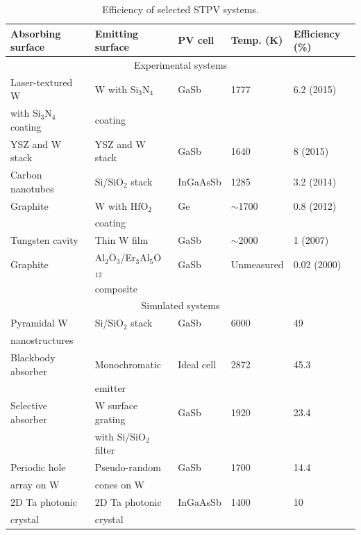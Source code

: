 \documentclass[10pt,letterpaper]{article}
\begin{document}
\begin{table}
	\caption{Efficiency of selected STPV systems.}
	\label{STPV_sys_table}
	\begin{center}
		\begin{tabular}{|lllll|}
		\hline
		Absorbing surface & Emitting surface & PV cell & Temp. (K) & Efficiency (\%)\\
		\hline
		\multicolumn{5}{c}{Experimental systems} \\
		\hline
		Laser-textured W & W with Si$_3$N$_4$ & GaSb & 1777& 6.2 \cite{me3} (2015)\\
		with Si$_3$N$_4$ coating & coating &&&\\
		YSZ and W stack	& YSZ and W stack	& GaSb & 1640 &	8 \cite{SKY_JPE_2015} (2015)\\
		Carbon nanotubes & Si/SiO$_2$ stack & InGaAsSb & 1285 & 3.2 \cite{MIT_paper}  (2014)\\
		Graphite & W with HfO$_2$ & Ge & $\sim$1700 & 0.8 \cite{exp_madrid}  (2012)\\
		& coating &&&\\
		Tungsten cavity & Thin W film & GaSb & $\sim$2000 & 1 \cite{exp_russia} (2007)\\
		Graphite & {A}l$_2${O}$_3$/{E}r$_3${A}l$_5${O}$_{12}$ & GaSb & Unmeasured & 0.02 \cite{exp_tokyo} (2000)\\
		& composite &&&\\
		\hline
		\multicolumn{5}{c}{Simulated systems} \\
		\hline
		Pyramidal W & Si/SiO$_2$ stack & GaSb & 6000 & 49~\cite{RF_OptExp_2009}\\
		nanostructures &&&&\\
		Blackbody absorber	& Monochromatic & Ideal cell	& 2872 & 45.3~\cite{global_opt}\\
		& emitter &&&\\
		Selective absorber	& W surface grating & GaSb & 1920 & 23.4~\cite{paper2_ref6} \\
		& with Si/SiO$_2$ filter & & &\\
		Periodic hole &	Pseudo-random & GaSb	& 1700 &	14.4~\cite{me_thesis}\\	
		array on W	& cones on W&&&\\	
		2D Ta photonic & 2D Ta photonic & InGaAsSb & 1400 & 10~\cite{NYL_SEMSC_2014}\\
		crystal& crystal &&&\\
		\hline
		\end{tabular}
	\end{center}
\end{table}
\end{document}
